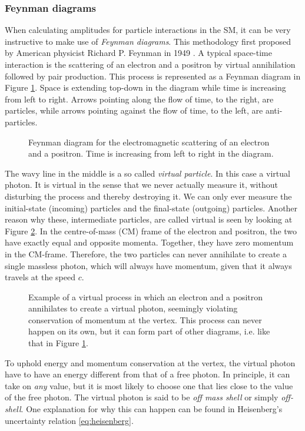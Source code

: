 \subsubsection{Feynman diagrams}
When calculating amplitudes for particle interactions in the SM, it can be very instructive to make use of \emph{Feynman diagrams}. This methodology first proposed by American physicist Richard P. Feynman in 1949 \cite{feynman1949sta}. A typical space-time interaction is the scattering of an electron and a positron by virtual annihilation followed by pair production. This process is represented as a Feynman diagram in Figure \ref{fig:feyn:ee_a_ee}. Space is extending top-down in the diagram while time is increasing from left to right. Arrows pointing along the flow of time, to the right, are particles, while arrows pointing against the flow of time, to the left, are anti-particles.
\begin{figure}[htp]
\centering
	
\caption{Feynman diagram for the electromagnetic scattering of an electron and a positron. Time is increasing from left to right in the diagram.} \label{fig:feyn:ee_a_ee}
\end{figure}
The wavy line in the middle is a so called \emph{virtual particle}. In this case a virtual photon. It is virtual in the sense that we never actually measure it, without disturbing the process and thereby destroying it. We can only ever measure the initial-state (incoming) particles and the final-state (outgoing) particles. Another reason why these, intermediate particles, are called virtual is seen by looking at Figure \ref{fig:feyn:ee_a}. In the centre-of-mass (CM) frame of the electron and positron, the two have exactly equal and opposite momenta. Together, they have zero momentum in the CM-frame. Therefore, the two particles can never annihilate to create a single massless photon, which will always have momentum, given that it always travels at the speed $c$. \cite{griffiths1987iep}
\begin{figure}[htp]
\centering
	
\caption{Example of a virtual process in which an electron and a positron annihilates to create a virtual photon, seemingly violating conservation of momentum at the vertex. This process can never happen on its own, but it can form part of other diagrams, i.e. like that in Figure \ref{fig:feyn:ee_a_ee}.} \label{fig:feyn:ee_a}
\end{figure}

To uphold energy and momentum conservation at the vertex, the virtual photon have to have an energy different from that of a free photon. In principle, it can take on \emph{any} value, but it is most likely to choose one that lies close to the value of the free photon. The virtual photon is said to be \emph{off mass shell} or simply \emph{off-shell}. One explanation for why this can happen can be found in Heisenberg's uncertainty relation \eqref{eq:heisenberg}.

